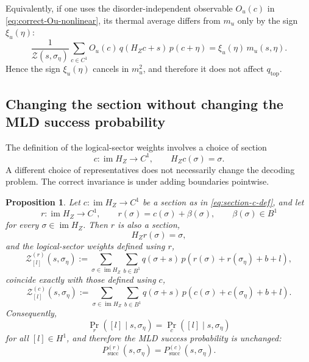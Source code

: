 \documentclass[twoside,english,aps,showpacs,pra,superscriptaddress]{revtex4-2}
\DeclareMathOperator{\im}{im}
\newtheorem{proposition}{Proposition}
\begin{document}
Equivalently, if one uses the disorder-independent observable \(O_u(c)\) in
\eqref{eq:correct-Ou-nonlinear}, its thermal average differs from \(m_u\) only
by the sign \(\xi_u(\eta)\):
\begin{equation}
    \frac{1}{\mathcal Z(s,\sigma_\eta)}
    \sum_{c\in C^1}
    O_u(c)\,
    q(H_Zc+s)\,
    p(c+\eta)
    =
    \xi_u(\eta)\,
    m_u(s,\eta).
\end{equation}
Hence the sign \(\xi_u(\eta)\) cancels in \(m_u^2\), and therefore it does not
affect \(q_{\mathrm{top}}\).

\subsection{Changing the section without changing the MLD success probability}

The definition of the logical-sector weights involves a choice of section
\begin{equation}\label{eq:section-c-def}
    c:\im H_Z\to C^1,
    \qquad
    H_Z c(\sigma)=\sigma .
\end{equation}
A different choice of representatives does not necessarily change the decoding problem. 
The correct invariance is under adding boundaries pointwise.

\begin{proposition}\label{prop:boundary-shift-invariance}
Let \(c:\im H_Z\to C^1\) be a section as in \eqref{eq:section-c-def}, and let
\begin{equation}\label{eq:r-boundary-shift}
    r:\im H_Z\to C^1,
    \qquad
    r(\sigma)=c(\sigma)+\beta(\sigma),
    \qquad
    \beta(\sigma)\in B^1
\end{equation}
for every \(\sigma\in \im H_Z\). Then \(r\) is also a section,
\begin{equation}\label{eq:r-is-section}
    H_Z r(\sigma)=\sigma,
\end{equation}
and the logical-sector weights defined using \(r\),
\begin{equation}\label{eq:Zl-r-def}
    \mathcal Z^{(r)}_{[l]}(s,\sigma_\eta)
    :=\sum_{\sigma\in \im H_Z}\sum_{b\in B^1}
    q(\sigma+s)\,
    p\!\left(r(\sigma)+r(\sigma_\eta)+b+l\right),
\end{equation}
coincide exactly with those defined using \(c\),
\begin{equation}\label{eq:Zl-c-def}
    \mathcal Z^{(c)}_{[l]}(s,\sigma_\eta)
    :=\sum_{\sigma\in \im H_Z}\sum_{b\in B^1}
    q(\sigma+s)\,
    p\!\left(c(\sigma)+c(\sigma_\eta)+b+l\right).
\end{equation}
Consequently,
\begin{equation}\label{eq:posterior-invariance}
    \Pr_r([l]\mid s,\sigma_\eta)=\Pr_c([l]\mid s,\sigma_\eta)
\end{equation}
for all \([l]\in H^1\), and therefore the MLD success probability is unchanged:
\begin{equation}\label{eq:success-invariance}
    P_{\mathrm{succ}}^{(r)}(s,\sigma_\eta)
    =
    P_{\mathrm{succ}}^{(c)}(s,\sigma_\eta).
\end{equation}
\end{proposition}
\end{document}
